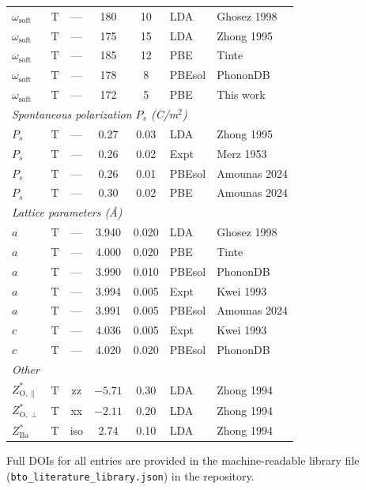 \documentclass[onecolumn,superscriptaddress,amsmath,amssymb,longbibliography]{revtex4-2}
\begin{document}
\begin{table}[ht]
\begin{tabular}{llcccll}
$\omega_{\mathrm{soft}}$ & T & --- & 180 & 10 & LDA & Ghosez 1998 \\
$\omega_{\mathrm{soft}}$ & T & --- & 175 & 15 & LDA & Zhong 1995 \\
$\omega_{\mathrm{soft}}$ & T & --- & 185 & 12 & PBE & Tinte \cite{Tinte2003} \\
$\omega_{\mathrm{soft}}$ & T & --- & 178 & 8 & PBEsol & PhononDB \\
$\omega_{\mathrm{soft}}$ & T & --- & 172 & 5 & PBE & This work \\
\midrule
\multicolumn{7}{l}{\textit{Spontaneous polarization $P_s$ (C/m$^2$)}} \\
$P_s$ & T & --- & 0.27 & 0.03 & LDA & Zhong 1995 \\
$P_s$ & T & --- & 0.26 & 0.02 & Expt & Merz 1953 \\
$P_s$ & T & --- & 0.26 & 0.01 & PBEsol & Amounas 2024 \\
$P_s$ & T & --- & 0.30 & 0.02 & PBE & Amounas 2024 \\
\midrule
\multicolumn{7}{l}{\textit{Lattice parameters (\AA)}} \\
$a$ & T & --- & 3.940 & 0.020 & LDA & Ghosez 1998 \\
$a$ & T & --- & 4.000 & 0.020 & PBE & Tinte \cite{Tinte2003} \\
$a$ & T & --- & 3.990 & 0.010 & PBEsol & PhononDB \\
$a$ & T & --- & 3.994 & 0.005 & Expt & Kwei 1993 \\
$a$ & T & --- & 3.991 & 0.005 & PBEsol & Amounas 2024 \\
$c$ & T & --- & 4.036 & 0.005 & Expt & Kwei 1993 \\
$c$ & T & --- & 4.020 & 0.020 & PBEsol & PhononDB \\
\midrule
\multicolumn{7}{l}{\textit{Other}} \\
$Z^*_{\mathrm{O},\parallel}$ & T & zz & $-5.71$ & 0.30 & LDA & Zhong 1994 \\
$Z^*_{\mathrm{O},\perp}$ & T & xx & $-2.11$ & 0.20 & LDA & Zhong 1994 \\
$Z^*_{\mathrm{Ba}}$ & T & iso & 2.74 & 0.10 & LDA & Zhong 1994 \\
\bottomrule
\end{tabular}
\end{table}

\noindent Full DOIs for all entries are provided in the machine-readable
library file (\texttt{bto\_literature\_library.json}) in the repository.


\end{document}
